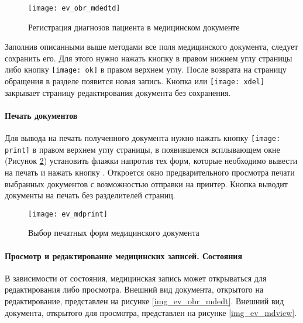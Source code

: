 {\begin{enumerate}
\end{enumerate}
 
  \begin{figure}[ht!]\centering
  	\texttt{[image: ev\_obr\_mdedtd]}
  	\caption{Регистрация диагнозов пациента в медицинском документе}
  	\label{img_ev_mdedtd}
  \end{figure}
  
Заполнив описанными выше методами все поля медицинского документа, следует сохранить его. Для этого нужно нажать кнопку  в правом нижнем углу страницы либо кнопку \texttt{[image: ok]} в правом верхнем углу. После возврата на страницу обращения в разделе  появится новая запись. Кнопка  или \texttt{[image: xdel]} закрывает страницу редактирования документа без сохранения.

\paragraph{Печать документов}

Для вывода на печать полученного документа нужно нажать кнопку \texttt{[image: print]} в правом верхнем углу страницы, в появившемся всплывающем окне (Рисунок \ref{img_ev_mdpirnt}) установить флажки напротив тех форм, которые необходимо вывести на печать и нажать кнопку . Откроется окно предварительного просмотра печати выбранных документов с возможностью отправки на принтер. Кнопка  выводит документы на печать без разделителей страниц.

 \begin{figure}[ht]\centering
   \texttt{[image: ev\_mdprint]}
   \caption{Выбор печатных форм медицинского документа}
   \label{img_ev_mdpirnt}
 \end{figure}
  
\paragraph{Просмотр и редактирование медицинских записей. Состояния}

В зависимости от состояния, медицинская запись может открываться для редактирования либо просмотра. Внешний вид документа, открытого на редактирование, представлен на рисунке \ref{img_ev_obr_mdedt}. Внешний вид документа, открытого для просмотра, представлен на рисунке \ref{img_ev_mdview}.

}
